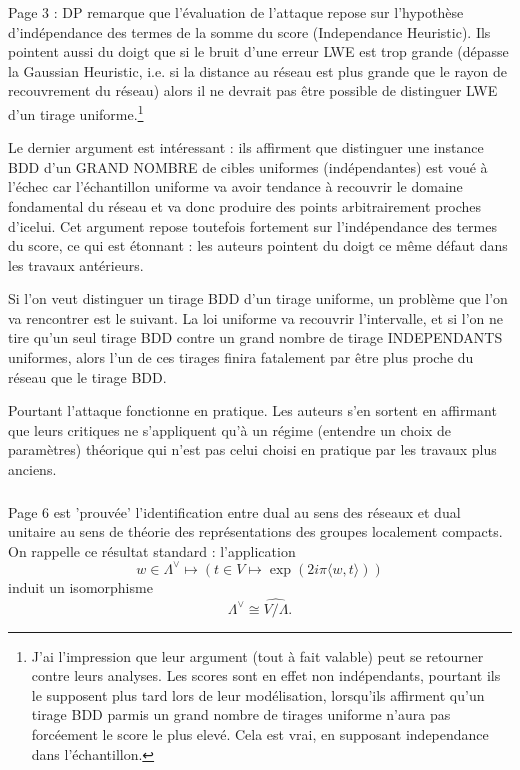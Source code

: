 \documentclass{article}
\begin{document}
\subsubsection{} Page 3 : DP remarque que l'évaluation de l'attaque repose sur l'hypothèse d'indépendance des termes de la somme du score (Independance Heuristic). Ils pointent aussi du doigt que si le bruit d'une erreur LWE est trop grande (dépasse la Gaussian Heuristic, i.e. si la distance au réseau est plus grande que le rayon de recouvrement du réseau) alors il ne devrait pas être possible de distinguer LWE d'un tirage uniforme.\footnote{J'ai l'impression que leur argument (tout à fait valable) peut se retourner contre leurs analyses. Les scores sont en effet non indépendants, pourtant ils le supposent plus tard lors de leur modélisation, lorsqu'ils affirment qu'un tirage BDD parmis un grand nombre de tirages uniforme n'aura pas forcéement le score le plus elevé. Cela est vrai, en supposant independance dans l'échantillon.}

Le dernier argument est intéressant : ils affirment que distinguer une instance BDD d'un GRAND NOMBRE de cibles uniformes (indépendantes) est voué à l'échec car l'échantillon uniforme va avoir tendance à recouvrir le domaine fondamental du réseau et va donc produire des points arbitrairement proches d'icelui. Cet argument repose toutefois fortement sur l'indépendance des termes du score, ce qui est étonnant : les auteurs pointent du doigt ce même défaut dans les travaux antérieurs.   

Si l'on veut distinguer un tirage BDD d'un tirage uniforme, un problème que l'on va rencontrer est le suivant. La loi uniforme va recouvrir l'intervalle, et si l'on ne tire qu'un seul tirage BDD contre un grand nombre de tirage INDEPENDANTS uniformes, alors l'un de ces tirages finira fatalement par être plus proche du réseau que le tirage BDD.

Pourtant l'attaque fonctionne en pratique. Les auteurs s'en sortent en affirmant que leurs critiques ne s'appliquent qu'à un régime (entendre un choix de paramètres) théorique qui n'est pas celui choisi en pratique par les travaux plus anciens.

\subsubsection{}

Page 6 est 'prouvée' l'identification entre dual au sens des réseaux et dual unitaire au sens de théorie des représentations des groupes localement compacts. On rappelle ce résultat standard : l'application 
$$w \in \Lambda^\vee \mapsto \left(t\in V \mapsto \exp(2i\pi \langle w,t \rangle)\right)$$ 
induit un isomorphisme $$\Lambda^\vee \cong \widehat{V/\Lambda}.$$ 
\end{document}
